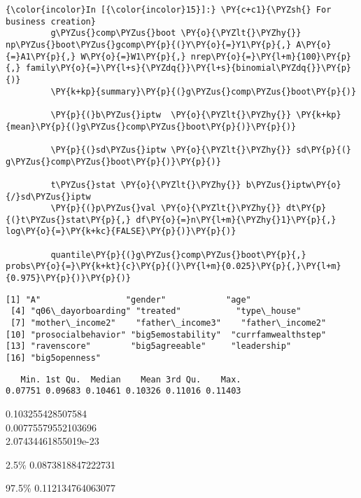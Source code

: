    \begin{Verbatim}[commandchars=\\\{\}]
{\color{incolor}In [{\color{incolor}15}]:} \PY{c+c1}{\PYZsh{} For business creation}
         g\PYZus{}comp\PYZus{}boot \PY{o}{\PYZlt{}\PYZhy{}} np\PYZus{}boot\PYZus{}gcomp\PY{p}{(}Y\PY{o}{=}Y1\PY{p}{,} A\PY{o}{=}A1\PY{p}{,} W\PY{o}{=}W1\PY{p}{,} nrep\PY{o}{=}\PY{l+m}{100}\PY{p}{,} family\PY{o}{=}\PY{l+s}{\PYZdq{}}\PY{l+s}{binomial\PYZdq{}}\PY{p}{)}
         \PY{k+kp}{summary}\PY{p}{(}g\PYZus{}comp\PYZus{}boot\PY{p}{)}
         
         \PY{p}{(}b\PYZus{}iptw  \PY{o}{\PYZlt{}\PYZhy{}} \PY{k+kp}{mean}\PY{p}{(}g\PYZus{}comp\PYZus{}boot\PY{p}{)}\PY{p}{)}
         
         \PY{p}{(}sd\PYZus{}iptw \PY{o}{\PYZlt{}\PYZhy{}} sd\PY{p}{(}  g\PYZus{}comp\PYZus{}boot\PY{p}{)}\PY{p}{)}
         
         t\PYZus{}stat \PY{o}{\PYZlt{}\PYZhy{}} b\PYZus{}iptw\PY{o}{/}sd\PYZus{}iptw
         \PY{p}{(}p\PYZus{}val \PY{o}{\PYZlt{}\PYZhy{}} dt\PY{p}{(}t\PYZus{}stat\PY{p}{,} df\PY{o}{=}n\PY{l+m}{\PYZhy{}1}\PY{p}{,} log\PY{o}{=}\PY{k+kc}{FALSE}\PY{p}{)}\PY{p}{)}
         
         quantile\PY{p}{(}g\PYZus{}comp\PYZus{}boot\PY{p}{,} probs\PY{o}{=}\PY{k+kt}{c}\PY{p}{(}\PY{l+m}{0.025}\PY{p}{,}\PY{l+m}{0.975}\PY{p}{)}\PY{p}{)}
\end{Verbatim}


    \begin{Verbatim}[commandchars=\\\{\}]
 [1] "A"                 "gender"            "age"              
 [4] "q06\_dayorboarding" "treated"           "type\_house"       
 [7] "mother\_income2"    "father\_income3"    "father\_income2"   
[10] "prosocialbehavior" "big5emostability"  "currfamwealthstep"
[13] "ravenscore"        "big5agreeable"     "leadership"       
[16] "big5openness"     

    \end{Verbatim}

    
    \begin{verbatim}
   Min. 1st Qu.  Median    Mean 3rd Qu.    Max. 
0.07751 0.09683 0.10461 0.10326 0.11016 0.11403 
    \end{verbatim}

    
    0.103255428507584\\

    
    0.00775579552103696\\

    
    2.07434461855019e-23\\

    
    \begin{description*}
\item[2.5\%] 0.0873818847222731\\
\item[97.5\%] 0.112134764063077
\end{description*}


